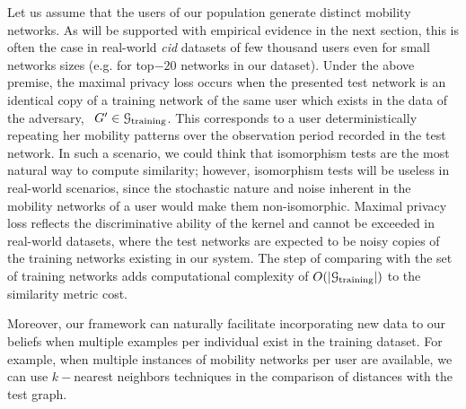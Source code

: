 Let us assume that the users of our population generate distinct mobility networks.
As will be supported with empirical evidence in the next section, this is often the case in real-world \emph{cid} datasets of few thousand users even for small networks sizes (e.g. for top$-20$ networks in our dataset).
Under the above premise, the maximal privacy loss occurs when the presented test network is an identical copy of a training network of the same user which exists in the data of the adversary, \ie\ $ G' \in \mathcal{G}_\text{training}$.
This corresponds to a user deterministically repeating her mobility patterns over the observation period recorded in the test network.
In such a scenario, we could think that isomorphism tests are the most natural way to compute similarity; however, isomorphism tests will be useless in real-world scenarios, since the stochastic nature and noise inherent in the mobility networks of a user would make them non-isomorphic.
Maximal privacy loss reflects the discriminative ability of the kernel and cannot be exceeded in real-world datasets, where the test networks are expected to be noisy copies of the training networks existing in our system.
The step of comparing with the set of training networks adds computational complexity of $O(|\mathcal{G}_{\text{training}}|)$ to the similarity metric cost.

Moreover, our framework can naturally facilitate incorporating new data to our beliefs when multiple examples per individual exist in the training dataset.
For example, when multiple instances of mobility networks per user are available, we can use $k-$nearest neighbors techniques in the comparison of distances with the test graph.
